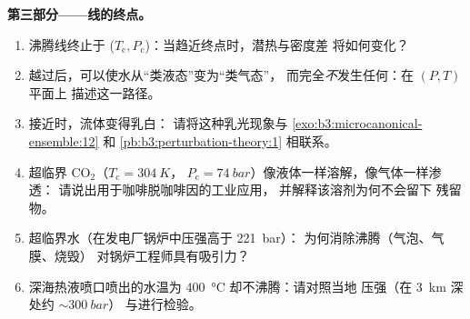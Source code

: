\begin{problem}
\medskip\noindent\textbf{第三部分——线的终点。}
\begin{enumerate}[resume]
  \item 沸腾线终止于 ($T_{\text{c}},
        P_{\text{c}}$)：当趋近终点时，潜热与密度差
        将如何变化？
  \item 越过后，可以使水从“类液态”变为“类气态”，
        而完全\emph{不}发生任何：在 $(P, T)$ 平面上
        描述这一路径。
  \item 接近时，流体变得乳白：
        请将这种乳光现象与
        \cref{exo:b3:microcanonical-ensemble:12} 和
        \cref{pb:b3:perturbation-theory:1} 相联系。
  \item 超临界 CO$_2$（$T_{\text{c}} = \qty{304}{K}$，
        $P_{\text{c}} = \qty{74}{bar}$）像液体一样溶解，像气体一样渗透：
        请说出用于咖啡脱咖啡因的工业应用，
        并解释该溶剂为何不会留下
        残留物。
  \item 超临界水（在发电厂锅炉中压强高于 \qty{221}{bar}）：
        为何消除沸腾（气泡、气膜、烧毁）
        对锅炉工程师具有吸引力？
  \item 深海热液喷口喷出的水温为
        \qty{400}{\celsius} 却不沸腾：请对照当地
        压强（在 \qty{3}{km} 深处约 $\sim\qty{300}{bar}$）
        与进行检验。
\end{enumerate}


\end{problem}
